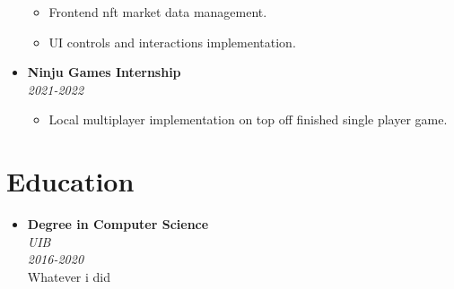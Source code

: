 \documentclass[9pt,oneside,a4paper,titlepage]{article}
\begin{document}
\begin{tcolorbox}
\begin{minipage}[t]{11cm}
\begin{tcolorbox}[grow to right by=0.75cm, colframe=white,colback=white]
\begin{itemize}
{\begin{itemize}
				      	      \item{Frontend nft market data management.}
				      	      \item{UI controls and interactions implementation.}
				            \end{itemize}
				            }
				      \item{
				            \textbf{Ninju Games Internship} \\
				            \emph{2021-2022} \\
				            \vspace*{-0.5cm}
				            \begin{itemize}
				      	      \item{Local multiplayer implementation on top off finished single player game.}
				            \end{itemize}
				            }
			\end{itemize}
			\section*{Education}
			\begin{itemize}
				\item{
				      \textbf{Degree in Computer Science} \\
				      \emph{UIB} \\
				      \emph{2016-2020} \\
				      Whatever i did
				      }

			\end{itemize}
		\end{tcolorbox}
	\end{minipage}
\end{tcolorbox}
\end{document}
